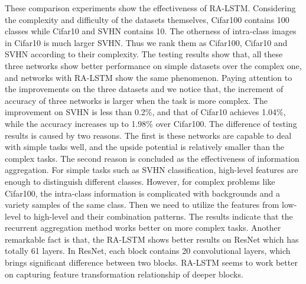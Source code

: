 \documentclass[runningheads]{llncs}
\begin{document}
These comparison experiments show the effectiveness of RA-LSTM. Considering the complexity and difficulty of the datasets themselves, Cifar100 contains 100 classes while Cifar10 and SVHN contains 10. The otherness of intra-class images in Cifar10 is much larger SVHN. Thus we rank them as Cifar100, Cifar10 and SVHN according to their complexity. The testing results show that, all these three networks show better performance on simple datasets over the complex one, and networks with RA-LSTM show the same phenomenon. Paying attention to the improvements on the three datasets and we notice that, the increment of accuracy of three networks is larger when the task is more complex. The improvement on SVHN is less than 0.2\%, and that of Cifar10 achieves 1.04\%, while the accuracy increases up to 1.98\% over Cifar100. The difference of testing results is caused by two reasons. The first is these networks are capable to deal with simple tasks well, and the upside potential is relatively smaller than the complex tasks. The second reason is concluded as the effectiveness of information aggregation. For simple tasks such as SVHN classification, high-level features are enough to distinguish different classes. However, for complex problems like Cifar100, the intra-class information is complicated with backgrounds and a variety samples of the same class. Then we need to utilize the features from low-level to high-level and their combination patterns. The results indicate that the recurrent aggregation method works better on more complex tasks. Another remarkable fact is that, the RA-LSTM shows better results on ResNet which has totally 61 layers. In ResNet, each block contains 20 convolutional layers, which brings significant difference between two blocks. RA-LSTM seems to work better on capturing feature transformation relationship of deeper blocks.
\end{document}

